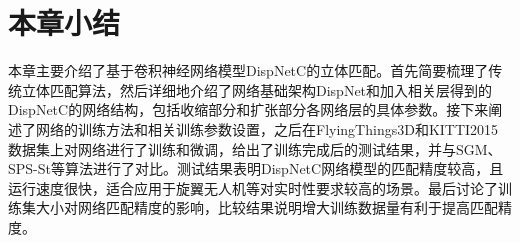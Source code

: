 \section{本章小结}
本章主要介绍了基于卷积神经网络模型DispNetC的立体匹配。首先简要梳理了传统立体匹配算法，然后详细地介绍了网络基础架构DispNet和加入相关层得到的DispNetC的网络结构，包括收缩部分和扩张部分各网络层的具体参数。接下来阐述了网络的训练方法和相关训练参数设置，之后在FlyingThings3D和KITTI2015数据集上对网络进行了训练和微调，给出了训练完成后的测试结果，并与SGM、SPS-St等算法进行了对比。测试结果表明DispNetC网络模型的匹配精度较高，且运行速度很快，适合应用于旋翼无人机等对实时性要求较高的场景。最后讨论了训练集大小对网络匹配精度的影响，比较结果说明增大训练数据量有利于提高匹配精度。







